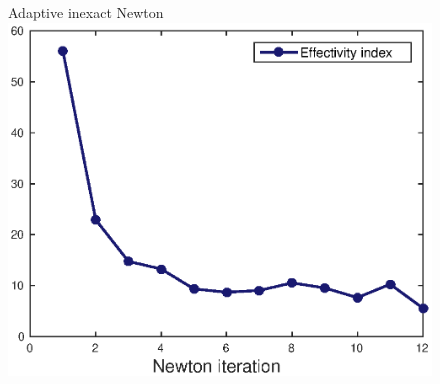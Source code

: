 \documentclass[10 pt]{beamer}
\begin{document}
\begin{frame}
\begin{figure}
\begin{minipage}[c]{.32\linewidth}
\end{minipage}\hfill
\begin{minipage}[c]{.33\linewidth}
   \centering
   Adaptive inexact  Newton 
\includegraphics[width=\textwidth]{fig_article/effectivity_index_adapt_inexact_resolution.eps}     
\end{minipage} \hfill
\end{figure}


\end{frame}
\end{document}
